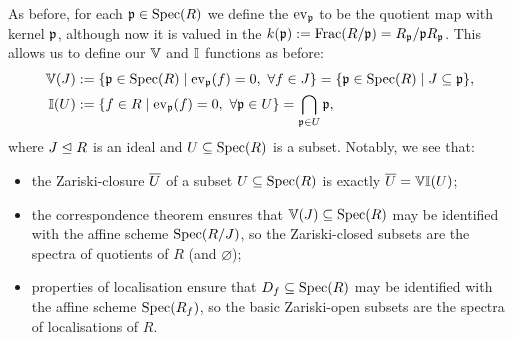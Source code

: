As before, for each $\mathfrak{p} \in \mathrm{Spec}(R)$ we define the  $\mathrm{ev}_{\mathfrak{p}}$ to be the quotient map with kernel $\mathfrak{p}$, although now it is valued in the  $k(\mathfrak{p}) := \mathrm{Frac}(R/\mathfrak{p}) = R_{\mathfrak{p}} / \mathfrak{p} R_{\mathfrak{p}}$. This allows us to define our $\mathbb{V}$ and $\mathbb{I}$ functions as before:
\begin{align*}
	\mathbb{V}(J) &:= \{\mathfrak{p} \in \mathrm{Spec}(R) \mid \mathrm{ev}_{\mathfrak{p}}(f)=0, \ \forall f \in J\} = \{\mathfrak{p} \in \mathrm{Spec}(R) \mid J \subseteq \mathfrak{p}\},\\
	\mathbb{I}(U) &:= \{f \in R \mid \mathrm{ev}_{\mathfrak{p}}(f) = 0, \ \forall \mathfrak{p} \in U\} = \bigcap_{\mathfrak{p} \in U} \mathfrak{p},
\end{align*}
where $J\trianglelefteq R$ is an ideal and $U \subseteq \mathrm{Spec}(R)$ is a subset. Notably, we see that:
\begin{itemize}
	\item the Zariski-closure $\overline{U}$ of a subset $U \subseteq \mathrm{Spec}(R)$ is exactly $\overline{U} = \mathbb{V}\mathbb{I}(U)$;
	\item the correspondence theorem ensures that $\mathbb{V}(J) \subseteq \mathrm{Spec}(R)$ may be identified with the affine scheme $\mathrm{Spec}(R/J)$, so the Zariski-closed subsets are the spectra of quotients of $R$ (and $\varnothing$);
	\item properties of localisation ensure that $D_f \subseteq \mathrm{Spec}(R)$ may be identified with the affine scheme $\mathrm{Spec}(R_f)$, so the basic Zariski-open subsets are the spectra of localisations of $R$.
\end{itemize}


